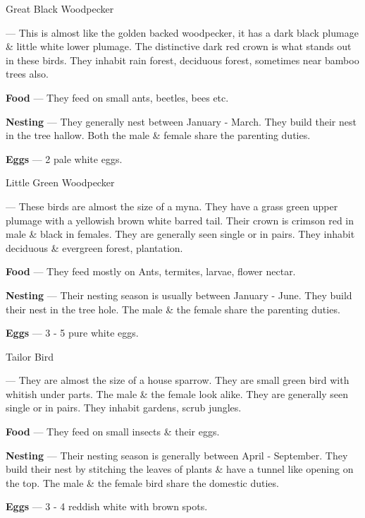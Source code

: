 \begin{bird}{Great Black Woodpecker}

 --- This is almost like the golden backed woodpecker, it has a dark black plumage \& little white lower plumage. The distinctive dark red crown is what stands out in these birds. They  inhabit rain forest, deciduous forest, sometimes near bamboo trees also.

{\large\bf Food} --- They feed on small ants, beetles, bees etc.

{\large\bf Nesting} --- They generally nest between January - March. They build their nest in the tree hallow. Both the male \& female share the parenting duties.

{\large\bf Eggs} --- 2 pale white eggs.
\end{bird}

\begin{bird}{Little Green Woodpecker}

 --- These birds are almost the size of a myna. They have a grass green upper plumage with a yellowish brown white barred tail. Their crown is crimson red in male \& black in females. They are generally seen single or in pairs. They inhabit deciduous \& evergreen forest, plantation.

{\large\bf Food} --- They feed mostly on Ants, termites, larvae, flower nectar.

{\large\bf Nesting} --- Their nesting season is usually between January - June. They  build their nest in the tree hole. The male \& the female share the parenting duties.

{\large\bf Eggs} --- 3 - 5 pure white eggs.
\end{bird}

\begin{bird}{Tailor Bird}

 --- They are almost the size of a house sparrow. They are small green bird with whitish under parts. The male \& the female look alike. They are generally seen single or in pairs. They inhabit gardens, scrub jungles.

{\large\bf Food} --- They feed on small insects \& their eggs.

{\large\bf Nesting} --- Their nesting season is generally between April - September. They build their nest by stitching the leaves of plants \& have a tunnel like opening on the top. The male \& the female bird share the domestic duties.

{\large\bf Eggs} --- 3 - 4 reddish white with brown spots.
\end{bird}

